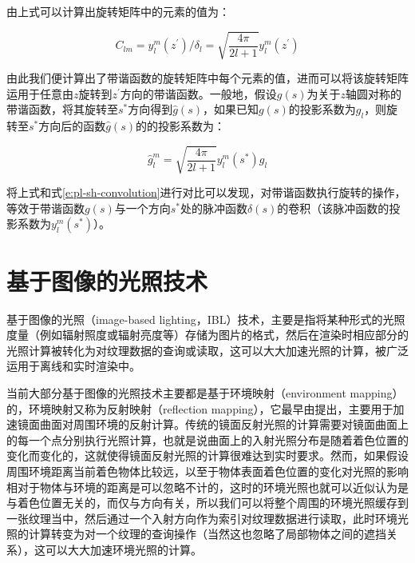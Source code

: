由上式可以计算出旋转矩阵中的元素的值为：

\begin{equation}
	C_{lm}=y^{m}_l(z^{'})/\delta_l=\sqrt{\frac{4\pi}{2l+1}} y^{m}_l(z^{'})
\end{equation}

由此我们便计算出了带谐函数的旋转矩阵中每个元素的值，进而可以将该旋转矩阵运用于任意由$z$旋转到$z^{'}$方向的带谐函数。一般地，假设$g(s)$为关于$z$轴圆对称的带谐函数，将其旋转至$s^{*}$方向得到$\hat{g}(s)$，如果已知$g(s)$的投影系数为$g_l$，则旋转至$s^{*}$方向后的函数$\hat{g}(s)$的的投影系数为：

\begin{equation}
	\hat{g}^{m}_l=\sqrt{\frac{4\pi}{2l+1}} y^{m}_l(s^{*}) g_l
\end{equation}

将上式和式\ref{e:pl-sh-convolution}进行对比可以发现，对带谐函数执行旋转的操作，等效于带谐函数$g(s)$与一个方向$s^{*}$处的脉冲函数$\delta(s)$的卷积（该脉冲函数的投影系数为$y^{m}_l(s^{*})$）。




\section{基于图像的光照技术}\label{sec:pl-ibl}
基于图像的光照（image-based lighting，IBL）技术，主要是指将某种形式的光照度量（例如辐射照度或辐射亮度等）存储为图片的格式，然后在渲染时相应部分的光照计算被转化为对纹理数据的查询或读取，这可以大大加速光照的计算，被广泛运用于离线和实时渲染中。

当前大部分基于图像的光照技术主要都是基于环境映射（environment mapping）的，环境映射又称为反射映射（reflection mapping），它最早由\cite{a:Textureandreflectionincomputergeneratedimages}提出，主要用于加速镜面曲面对周围环境的反射计算。传统的镜面反射光照的计算需要对镜面曲面上的每一个点分别执行光照计算，也就是说曲面上的入射光照分布是随着着色位置的变化而变化的，这就使得镜面反射光照的计算很难达到实时要求。然而，如果假设周围环境距离当前着色物体比较远，以至于物体表面着色位置的变化对光照的影响相对于物体与环境的距离是可以忽略不计的，这时的环境光照也就可以近似认为是与着色位置无关的，而仅与方向有关，所以我们可以将整个周围的环境光照缓存到一张纹理当中，然后通过一个入射方向作为索引对纹理数据进行读取，此时环境光照的计算转变为对一个纹理的查询操作（当然这也忽略了局部物体之间的遮挡关系），这可以大大加速环境光照的计算。

